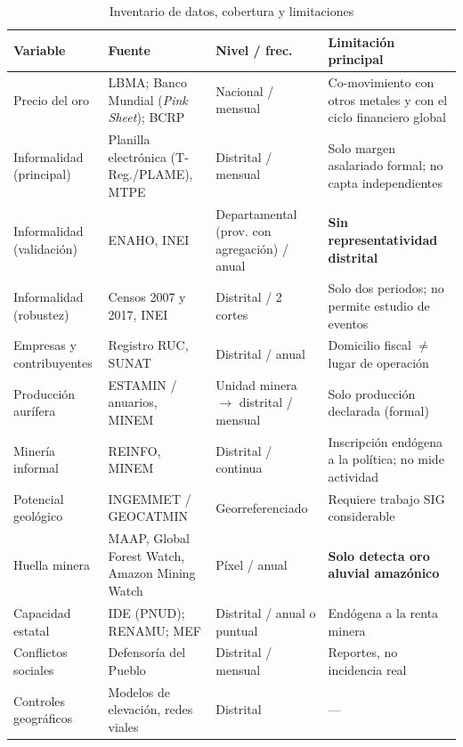 \documentclass[11pt,a4paper]{article}
\begin{document}
\begin{table}[p]
\centering
\singlespacing
\caption{Inventario de datos, cobertura y limitaciones}
\label{tab:datos}
\small
\begin{tabularx}{\textwidth}{L{2.7cm} L{3.0cm} L{2.7cm} X}
\toprule
\textbf{Variable} & \textbf{Fuente} & \textbf{Nivel / frec.} & \textbf{Limitación principal} \\
\midrule
Precio del oro & LBMA; Banco Mundial (\emph{Pink Sheet}); BCRP & Nacional / mensual & Co-movimiento con otros metales y con el ciclo financiero global \\
\addlinespace
Informalidad (principal) & Planilla electrónica (T-Reg./PLAME), MTPE & Distrital / mensual & Solo margen asalariado formal; no capta independientes \\
\addlinespace
Informalidad (validación) & ENAHO, INEI & Departamental (prov. con agregación) / anual & \textbf{Sin representatividad distrital} \\
\addlinespace
Informalidad (robustez) & Censos 2007 y 2017, INEI & Distrital / 2 cortes & Solo dos periodos; no permite estudio de eventos \\
\addlinespace
Empresas y contribuyentes & Registro RUC, SUNAT & Distrital / anual & Domicilio fiscal $\neq$ lugar de operación \\
\addlinespace
Producción aurífera & ESTAMIN / anuarios, MINEM & Unidad minera $\to$ distrital / mensual & Solo producción declarada (formal) \\
\addlinespace
Minería informal & REINFO, MINEM & Distrital / continua & Inscripción endógena a la política; no mide actividad \\
\addlinespace
Potencial geológico & INGEMMET / GEOCATMIN & Georreferenciado & Requiere trabajo SIG considerable \\
\addlinespace
Huella minera & MAAP, Global Forest Watch, Amazon Mining Watch & Píxel / anual & \textbf{Solo detecta oro aluvial amazónico} \\
\addlinespace
Capacidad estatal & IDE (PNUD); RENAMU; MEF & Distrital / anual o puntual & Endógena a la renta minera \\
\addlinespace
Conflictos sociales & Defensoría del Pueblo & Distrital / mensual & Reportes, no incidencia real \\
\addlinespace
Controles geográficos & Modelos de elevación, redes viales & Distrital & --- \\
\bottomrule
\end{tabularx}
\end{table}
\end{document}
